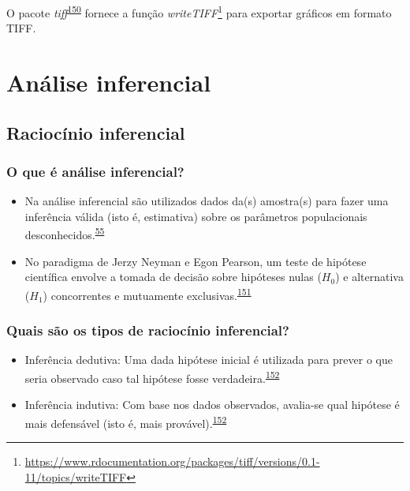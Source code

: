 \documentclass[
  a4paper,
]{book}
\renewcommand{\href}[2]{#2\footnote{\url{#1}}}
\newenvironment{infobox}[1]
  {
  \begin{itemize}
  \renewcommand{\labelitemi}{
    \raisebox{-.7\height}[0pt][0pt]{
      {\setkeys{Gin}{width=3em,keepaspectratio}
        \texttt{[image: \#1]}}
    }
  }
  \setlength{\fboxsep}{1em}
  \begin{blackbox}
  \item
  }
  {
  \end{blackbox}
  \end{itemize}
  }
\begin{document}
\begin{infobox}{images/Rlogo}
O pacote \emph{tiff}\textsuperscript{\protect\hyperlink{ref-tiff}{150}} fornece a função \href{https://www.rdocumentation.org/packages/tiff/versions/0.1-11/topics/writeTIFF}{\emph{writeTIFF}} para exportar gráficos em formato TIFF.

\end{infobox}

\hypertarget{analise-inferencial}{%
\chapter{\texorpdfstring{\textbf{Análise inferencial}}{Análise inferencial}}\label{analise-inferencial}}

\hypertarget{raciocinio-inferencial}{%
\section{Raciocínio inferencial}\label{raciocinio-inferencial}}

\hypertarget{o-que-uxe9-anuxe1lise-inferencial}{%
\subsection{O que é análise inferencial?}\label{o-que-uxe9-anuxe1lise-inferencial}}

\begin{itemize}
\item
  Na análise inferencial são utilizados dados da(s) amostra(s) para fazer uma inferência válida (isto é, estimativa) sobre os parâmetros populacionais desconhecidos.\textsuperscript{\protect\hyperlink{ref-vetter2017}{55}}
\item
  No paradigma de Jerzy Neyman e Egon Pearson, um teste de hipótese científica envolve a tomada de decisão sobre hipóteses nulas (\(H_{0}\)) e alternativa (\(H_{1}\)) concorrentes e mutuamente exclusivas.\textsuperscript{\protect\hyperlink{ref-Curran-Everett2009}{151}}
\end{itemize}

\hypertarget{quais-suxe3o-os-tipos-de-raciocuxednio-inferencial}{%
\subsection{Quais são os tipos de raciocínio inferencial?}\label{quais-suxe3o-os-tipos-de-raciocuxednio-inferencial}}

\begin{itemize}
\item
  Inferência dedutiva: Uma dada hipótese inicial é utilizada para prever o que seria observado caso tal hipótese fosse verdadeira.\textsuperscript{\protect\hyperlink{ref-goodman1999}{152}}
\item
  Inferência indutiva: Com base nos dados observados, avalia-se qual hipótese é mais defensável (isto é, mais provável).\textsuperscript{\protect\hyperlink{ref-goodman1999}{152}}
\end{itemize}
\end{document}
